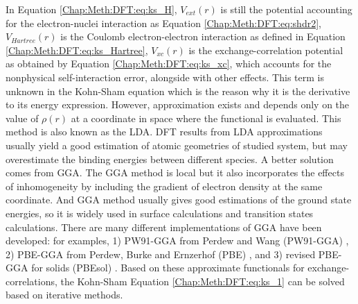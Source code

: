 In Equation \ref{Chap:Meth:DFT:eq:ks_H}, $V_{ext}(r)$ is still the potential accounting for the electron-nuclei interaction as Equation \ref{Chap:Meth:DFT:eq:shdr2}, $V_{Hartree}(r)$ is the Coulomb electron-electron interaction as defined in Equation \ref{Chap:Meth:DFT:eq:ks_Hartree}, $V_{xc}(r)$ is the exchange-correlation potential as obtained by Equation \ref{Chap:Meth:DFT:eq:ks_xc}, which accounts for the nonphysical self-interaction error, alongside with other effects. This term is unknown in the Kohn-Sham equation which is the reason why it is the derivative to its energy expression. However, approximation exists and depends only on the value of $\rho(r)$ at a coordinate in space where the functional is evaluated. This method is also known as the \acf{LDA}. \cite{perdew1981self} DFT results from \ac{LDA} approximations usually yield a good estimation of atomic geometries of studied system, but may overestimate the binding energies between different species. A better solution comes from \acf{GGA}. \cite{perdew1986density} The \ac{GGA} method is local but it also incorporates the effects of inhomogeneity by including the gradient of electron density at the same coordinate. \cite{ceperley1980ground} And \ac{GGA} method usually gives good estimations of the ground state energies, so it is widely used in surface calculations and transition states calculations. There are many different implementations of GGA have been developed: for examples, 1) PW91-GGA from Perdew and Wang (PW91-GGA) \cite{perdew1992accurate}, 2) PBE-GGA from Perdew, Burke and Ernzerhof (PBE) \cite{perdew1996generalized}, and 3) revised PBE-GGA for solids (PBEsol) \cite{perdew2008restoring}. Based on these approximate functionals for exchange-correlations, the Kohn-Sham Equation \ref{Chap:Meth:DFT:eq:ks_1} can be solved based on iterative methods.